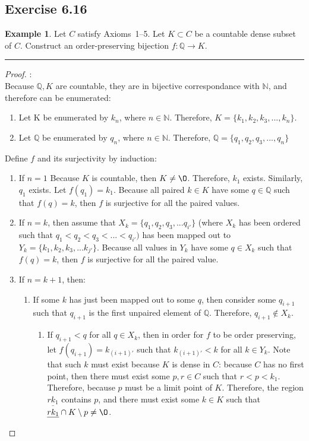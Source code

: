 \documentclass[openany, amssymb, psamsfonts]{amsart}
\newcommand{\bbN}{\mathbb{N}}
\newcommand{\bbQ}{\mathbb{Q}}
\renewcommand{\emptyset}{\O}
\newcommand{\sm}{\setminus}
\newcommand{\arr}{\longrightarrow}
\theoremstyle{definition}
\newtheorem{exmp}{Example}[section]
\numberwithin{equation}{section}
\begin{document}
\subsection*{Exercise 6.16}
\begin{exmp}
	Let $C$ satisfy Axioms~1--5. Let $K \subset C$ be a countable dense subset of $C$. Construct an order-preserving bijection $f\colon \bbQ \arr K$. 
\end{exmp}
\vspace{4pt}     \hrule   \vspace{4pt}
\begin{proof}:\\
Because $\bbQ, K$ are countable, they are in bijective correspondance with $\bbN$, and therefore can be enumerated:
\begin{enumerate}
    \item Let K be enumerated by $k_n$, where $n\in \bbN$. Therefore, $K = \{k_1, k_2, k_3,..., k_n\}$.
    \item Let $\bbQ$ be enumerated by $q_n$, where $n\in \bbN$. Therefore, $\bbQ = \{q_1,q_2,q_3,..., q_n\}$
\end{enumerate}
Define $f$ and its surjectivity by induction:
\begin{enumerate}
    \item If $n=1$ Because $K$ is countable, then $K\neq \emptyset$. Therefore, $k_1$ exists. Similarly, $q_1$ exists. Let $f(q_1) = k_1$. Because all paired $k\in K$ have some $q\in \bbQ$ such that $f(q) = k$, then $f$ is surjective for all the paired values.
    \item If $n=k$, then assume that $X_k = \{q_1,q_2,q_3,... q_{i'}\}$ (where $X_k$ has been ordered such that $q_1<q_2<q_3<...<q_{i'})$ has been mapped out to $Y_k = \{k_1,k_2,k_3,... k_{j'}\}$. Because all values in $Y_k$ have some $q\in X_k$ such that $f(q) = k$, then $f$ is surjective for all the paired value. 
    \item If $n=k+1$, then:
    \begin{enumerate}
    \item If some $k$ has just been mapped out to some $q$, then consider some $q_{i+1}$ such that $q_{i+1}$ is the first unpaired element of $\bbQ$. Therefore, $q_{i+1}\notin X_k$. 
    \begin{enumerate}
    \item If $q_{i+1}<q$ for all $q\in X_k$, then in order for $f$ to be order preserving, let $f(q_{i+1}) = k_{(i+1)'}$ such that $k_{(i+1)'} < k$ for all $k\in Y_k$. Note that such $k$ must exist because $K$ is dense in $C$: because $C$ has no first point, then there must exist some $p,r\in C$ such that $r<p<k_1$. Therefore, because $p$ must be a limit point of $K$. Therefore, the region $\underline{rk_1}$ contains $p$, and there must exist some $k\in K$ such that $\underline{rk_1} \cap K\sm{p} \neq \emptyset$.

\end{enumerate}
\end{enumerate}
\end{enumerate}
\end{proof}
\end{document}
